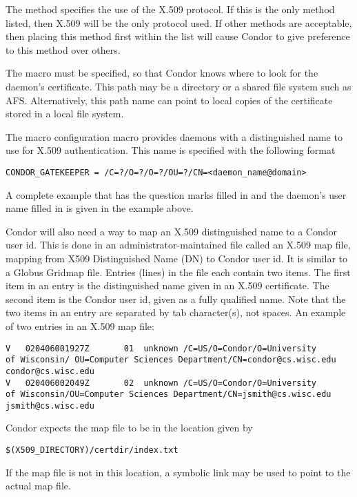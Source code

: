 \begin{description}
The  method specifies the use of
the X.509 protocol. 
If this is the only method listed, then X.509 will be the only
protocol used.
If other methods are acceptable, then placing this method
first within the list will cause Condor to give preference to
this method over others.

The macro  must be specified,
so that Condor knows where to look for the daemon's certificate.
This path may be a directory or a shared file system such as AFS. 
Alternatively, this path name
can point to 
local copies of the certificate stored
in a local file system.

The macro  configuration macro
provides daemons with a distinguished name to use for
X.509 authentication.
This name is specified with the following format
\begin{verbatim}
CONDOR_GATEKEEPER = /C=?/O=?/O=?/OU=?/CN=<daemon_name@domain>
\end{verbatim}
A complete example that has the question marks filled in and the
daemon's user name filled in is given in the 
example above.

Condor will also need a way to map an X.509 distinguished
name to a Condor user id.
This is done in an administrator-maintained file called an X.509 map file,
mapping from X509 Distinguished Name (DN) to Condor user id.
It is similar to a Globus Gridmap file.
Entries (lines) in the file each contain two items.
The first item in an entry is the distinguished name
given in an X.509 certificate.
The second item is the Condor user id, given as a
fully qualified name.
Note that the two items in an entry are separated by tab character(s),
not spaces.
An example of two entries in an X.509 map file:

\begin{verbatim}
V	020406001927Z		01	unknown	/C=US/O=Condor/O=University
of Wisconsin/ OU=Computer Sciences Department/CN=condor@cs.wisc.edu
condor@cs.wisc.edu
V	020406002049Z		02	unknown	/C=US/O=Condor/O=University
of Wisconsin/OU=Computer Sciences Department/CN=jsmith@cs.wisc.edu
jsmith@cs.wisc.edu
\end{verbatim}

Condor expects the map file to be in the location given by
\begin{verbatim}
$(X509_DIRECTORY)/certdir/index.txt
\end{verbatim}
If the map file is not in this location, a symbolic link
may be used to point to the actual map file.


\end{description}
